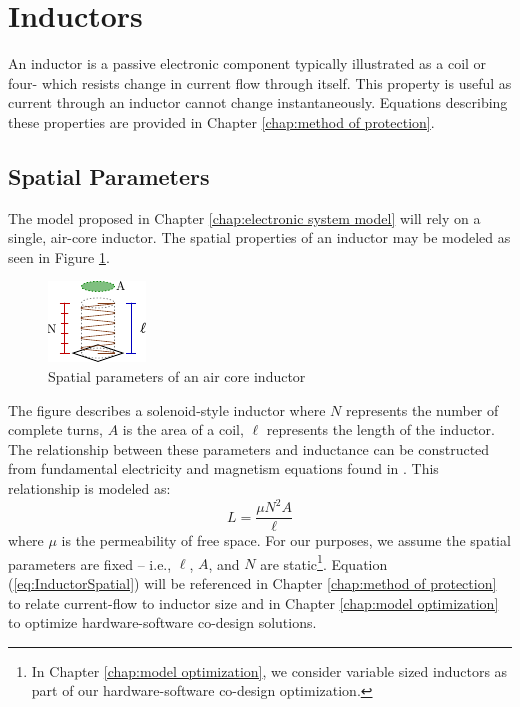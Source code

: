 \documentclass[11pt,oneside]{report}
\begin{document}
    \section{Inductors}
    An inductor is a passive electronic component typically illustrated as a coil or four- which resists change in current flow through itself. This property is useful as current through an inductor cannot change instantaneously. Equations describing these properties are provided in Chapter \ref{chap:method of protection}.
    \subsection{Spatial Parameters}
    The model proposed in Chapter \ref{chap:electronic system model} will rely on a single, air-core inductor. The spatial properties of an inductor may be modeled as seen in Figure \ref{fig:InductorParams}.
    \begin{figure}
        \centering
        \includegraphics[width=0.25\linewidth]{img/Inductor_Parameters.pdf}
        \caption[Air Core Inductor Spatial Parameters]{Spatial parameters of an air core inductor}
        \label{fig:InductorParams}
    \end{figure}
    The figure describes a solenoid-style inductor where $N$ represents the number of complete turns, $A$ is the area of a coil, $\ell$ represents the length of the inductor. The relationship between these parameters and inductance can be constructed from fundamental electricity and magnetism equations found in \cite{uniphy}. This relationship is modeled as:
    \begin{equation}\label{eq:InductorSpatial}
    L = \frac{\mu N^{2}A}{\ell}
    \end{equation}
    where $\mu$ is the permeability of free space. For our purposes, we assume the spatial parameters are fixed -- i.e., $\ell$, $A$, and $N$ are static\footnote{In Chapter \ref{chap:model optimization}, we consider variable sized inductors as part of our hardware-software co-design optimization.}. Equation (\ref{eq:InductorSpatial}) will be referenced in Chapter \ref{chap:method of protection} to relate current-flow to inductor size and in Chapter \ref{chap:model optimization} to optimize hardware-software co-design solutions.
\end{document}
